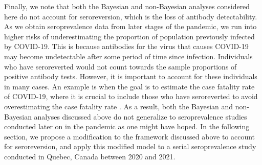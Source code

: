 Finally, we note that both the Bayesian and non-Bayesian analyses considered here do not account for seroreversion, which is the loss of antibody detectability. As we obtain seroprevalence data from later stages of the pandemic, we run into higher risks of underestimating the proportion of population previously infected by COVID-19. This is because antibodies for the virus that causes COVID-19 may become undetectable after some period of time since infection. Individuals who have seroreverted would not count towards the sample proportions of positive antibody tests. However, it is important to account for these individuals in many cases. An example is when the goal is to estimate the case fatality rate of COVID-19, where it is crucial to include those who have seroreverted to avoid overestimating the case fatality rate \citep{brazeau2022estimating}. As a result, both the Bayesian and non-Bayesian analyses discussed above do not generalize to seroprevalence studies conducted later on in the pandemic as one might have hoped. In the following section, we propose a modification to the framework discussed above to account for seroreversion, and apply this modified model to a serial seroprevalence study conducted in Quebec, Canada between 2020 and 2021.